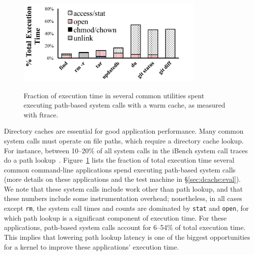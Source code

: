 


\begin{figure}[t]
\scriptsize
\centering
\includegraphics[width=3.6in]{dcache/plots/syscall-percentage.pdf} \\
\caption[Fraction of execution time on path-based system calls.]
{Fraction of execution time in several common utilities spent
executing path-based system calls with a warm cache, as measured with ftrace.}
\label{fig:dcache:lookup-frac}
\end{figure}


Directory caches are essential for good application performance.
Many common system calls must operate on file paths,
which require a directory cache lookup.
For instance, between 10--20\% of all system calls in the iBench system call traces do a path lookup~\citep{filenotafile}. 
Figure~\ref{fig:dcache:lookup-frac} lists the fraction of total execution time
several common command-line applications spend executing path-based system calls
(more details on these applications and the test machine in \S\ref{sec:dcache:eval}).
We note that these system calls include work other than path lookup,
and that these numbers include some instrumentation overhead;
nonetheless, in all cases except {\tt rm},
the system call times and counts are dominated by
{\tt stat} and {\tt open}, for which 
path lookup is a significant component of execution time.
For these applications, path-based system calls account for 6--54\% of total execution time.
This implies that
lowering path lookup latency is
 one of the  biggest 
opportunities for a kernel to improve these applications' execution time.




